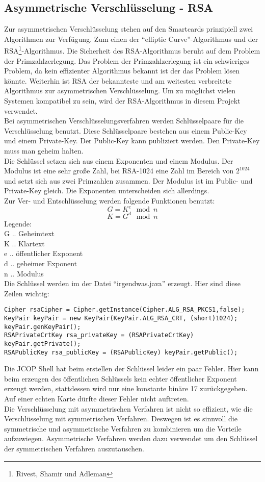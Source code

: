 \documentclass[parskip]{scrartcl}
\begin{document}
\subsection{Asymmetrische Verschlüsselung - RSA}
Zur asymmetrischen Verschlüsselung stehen auf den Smartcards prinzipiell zwei Algorithmen zur Verfügung. Zum einen der \enquote{elliptic Curve}-Algorithmus und der RSA\footnote{Rivest, Shamir und Adleman}-Algorithmus. Die Sicherheit des RSA-Algorithmus beruht auf dem Problem der Primzahlzerlegung. Das Problem der Primzahlzerlegung ist ein schwieriges Problem, da kein effizienter Algorithmus bekannt ist der das Problem lösen könnte. Weiterhin ist RSA der bekannteste und am weitesten verbreitete Algorithmus zur asymmetrischen Verschlüsselung. Um zu möglichst vielen Systemen kompatibel zu sein, wird der RSA-Algorithmus in diesem Projekt verwendet.\\
Bei asymmetrischen Verschlüsselungsverfahren werden Schlüsselpaare für die Verschlüsselung benutzt. Diese Schlüsselpaare bestehen aus einem Public-Key und einem Private-Key. Der Public-Key kann publiziert werden. Den Private-Key muss man geheim halten.\\
Die Schlüssel setzen sich aus einem Exponenten und einem Modulus. Der Modulus ist eine sehr große Zahl, bei RSA-1024 eine Zahl im Bereich von $ 2^{1024} $ und setzt sich aus zwei Primzahlen zusammen. Der Modulus ist im Public- und Private-Key gleich. Die Exponenten unterscheiden sich allerdings.\\
Zur Ver- und Entschlüsselung werden folgende Funktionen benutzt:  
 $$ G = K^{e}\mod{n} $$
 $$ K = G^{d}\mod{n} $$
 Legende: \\
 G .. Geheimtext\\
 K .. Klartext\\
 e .. öffentlicher Exponent\\
 d .. geheimer Exponent\\
 n .. Modulus\\
Die Schlüssel werden im der Datei \enquote{irgendwas.java} erzeugt. Hier sind diese Zeilen wichtig:
\begin{lstlisting}
Cipher rsaCipher = Cipher.getInstance(Cipher.ALG_RSA_PKCS1,false);
KeyPair keyPair = new KeyPair(KeyPair.ALG_RSA_CRT, (short)1024);
keyPair.genKeyPair();
RSAPrivateCrtKey rsa_privateKey = (RSAPrivateCrtKey) keyPair.getPrivate();
RSAPublicKey rsa_publicKey = (RSAPublicKey) keyPair.getPublic();
\end{lstlisting}
Die JCOP Shell hat beim erstellen der Schlüssel leider ein paar Fehler. Hier kann beim erzeugen des öffentlichen Schlüssels kein echter öffentlicher Exponent erzeugt werden, stattdessen wird nur eine konstante binäre 17 zurückgegeben.\\
Auf einer echten Karte dürfte dieser Fehler nicht auftreten.\\
Die Verschlüsselung mit asymmetrischen Verfahren ist nicht so effizient, wie die Verschlüsselung mit symmetrischen Verfahren. Deswegen ist es sinnvoll die symmetrische und asymmetrische Verfahren zu kombinieren um die Vorteile aufzuwiegen. Asymmetrische Verfahren werden dazu verwendet um den Schlüssel der symmetrischen Verfahren auszutauschen.
\end{document}
